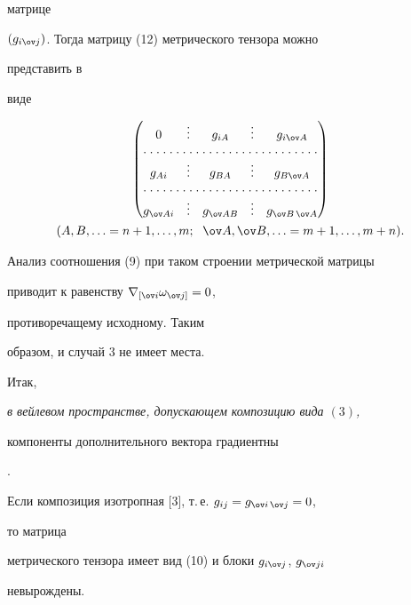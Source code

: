 матрице 


$(g_{i\ov j})$. Тогда матрицу (12) метрического тензора можно 


представить в 


виде 


\begin{gather*} 


\begin{pmatrix} 


0 & \vdots & g_{i A} & \vdots & g_{i\ov A}\\ 


\hdotsfor[1.5]{5} \\ 


g_{A i} & \vdots & g_{B A} & \vdots & g_{B \ov A}\\ 


\hdotsfor[1.5]{5} \\ 


g_{\ov A i} & \vdots & g_{\ov A B} & \vdots & g_{\ov B\,\ov A} 


\end{pmatrix} 


\\ 


(A,B,\dotsc=n+1,\dotsc,m; 


\ \; \ov A,\ov B,\dotsc=m+1,\dotsc,m+n). 


\end{gather*} 


 


Анализ соотношения (9) при таком строении метрической матрицы 


приводит к равенству $\nabla_{[\ov i}\omega_{\ov j]}=0$, 


противоречащему исходному. Таким 


образом, и случай 3 не имеет места. 


 


Итак, {\it в вейлевом пространстве, допускающем композицию вида $(3)$, 


компоненты дополнительного вектора градиентны}. 





Если композиция изотропная [3], т.\,е. $g_{i j}=g_{\ov i\,\ov j}=0$, 


то матрица 


метрического тензора имеет вид (10) и блоки $g_{i\ov j}$, $g_{\ov j i}$ 


невырождены. 


